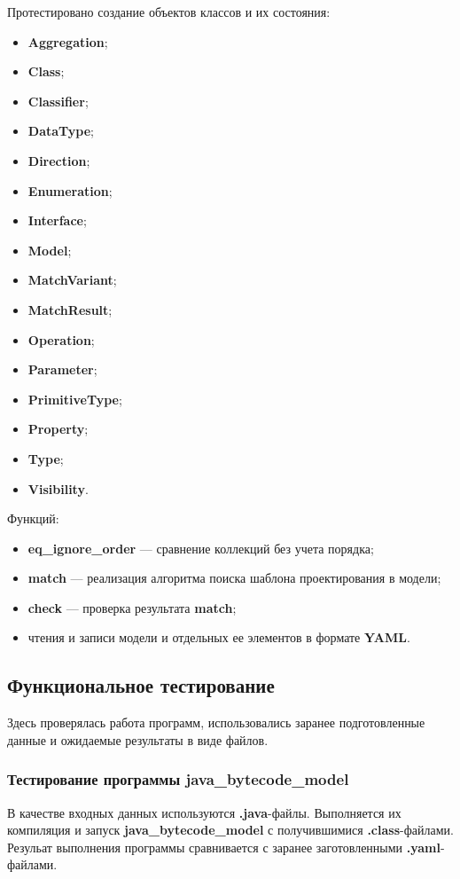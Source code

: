 Протестировано создание объектов классов и их состояния:
\begin{itemize}
\item \textbf{Aggregation};
\item \textbf{Class};
\item \textbf{Classifier};
\item \textbf{DataType};
\item \textbf{Direction};
\item \textbf{Enumeration};
\item \textbf{Interface};
\item \textbf{Model};
\item \textbf{MatchVariant};
\item \textbf{MatchResult};
\item \textbf{Operation};
\item \textbf{Parameter};
\item \textbf{PrimitiveType};
\item \textbf{Property};
\item \textbf{Type};
\item \textbf{Visibility}.
\end{itemize}

Функций:
\begin{itemize}
\item \textbf{eq\_ignore\_order} --- сравнение коллекций без учета порядка;
\item \textbf{match} --- реализация алгоритма поиска шаблона проектирования в модели;
\item \textbf{check} --- проверка результата \textbf{match};
\item чтения и записи модели и отдельных ее элементов в формате \textbf{YAML}.
\end{itemize}

\subsection{Функциональное тестирование}

Здесь проверялась работа программ, использовались заранее подготовленные данные
и ожидаемые результаты в виде файлов.

\subsubsection{Тестирование программы java\_bytecode\_model}

В качестве входных данных используются \textbf{.java}-файлы.
Выполняется их компиляция и запуск \textbf{java\_bytecode\_model} с
получившимися \textbf{.class}-файлами.
Резульат выполнения программы сравнивается с заранее заготовленными
\textbf{.yaml}-файлами.

